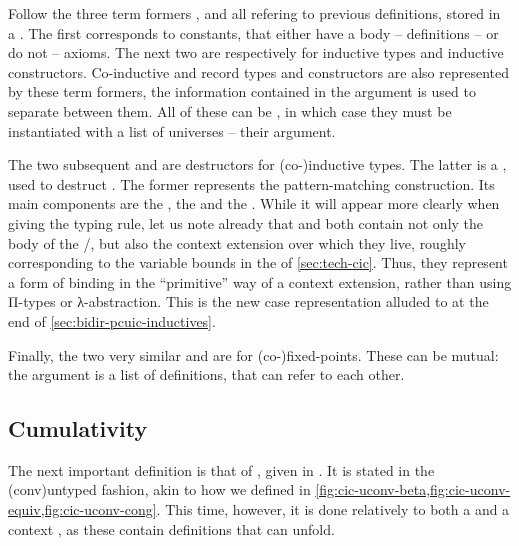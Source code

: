 Follow the three term formers ,  and
 all refering to previous definitions, stored in a .
The first corresponds to constants, that either have a body – definitions –
or do not – axioms. The next two are respectively for
inductive types and inductive constructors. Co-inductive and record types and
constructors are also represented by these term formers, the information contained in the
 argument is used to separate between them.
All of these can be , in which case they must be instantiated
with a list of universes – their  argument.

The two subsequent  and  are destructors for (co-)inductive types. The
latter is a , used to destruct . The former represents the
pattern-matching construction. Its main components are the  , the
  and the  . While it will appear more clearly
when giving the typing rule, let us note already that  and  both contain not
only the body of the /, but also the context extension over which
they live, roughly corresponding to the variable bounds in the  of \cref{sec:tech-cic}.
Thus, they represent a form of binding in the “primitive” way of a context extension, rather
than using Π-types or λ-abstraction. This is the new case representation alluded to
at the end of \cref{sec:bidir-pcuic-inductives}.

Finally, the two very similar  and  are for (co-)fixed-points. 
These can be mutual: the  argument is a list of definitions,
that can refer to each other.

\subsection{Cumulativity}

The next important definition is that of , given in .%
It is stated in the  \kl(conv){untyped} fashion,
akin to how we defined  in
\cref{fig:cic-uconv-beta,fig:cic-uconv-equiv,fig:cic-uconv-cong}.
This time, however, it is done relatively to
both a   and a context ,
as these contain definitions that  can unfold.

